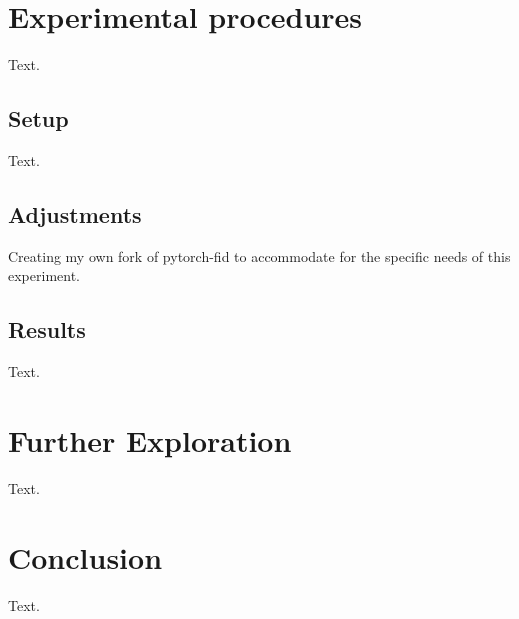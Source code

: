 \documentclass{article}
\begin{document}
\section{Experimental procedures}
Text.
\subsection{Setup}
Text.
\subsection{Adjustments}
Creating my own fork of pytorch-fid \cite{Seitzer2020FID} to accommodate for the specific needs of this experiment.
\subsection{Results}
Text.

\section{Further Exploration}
Text.

\section{Conclusion}
Text.

\newpage


\end{document}

